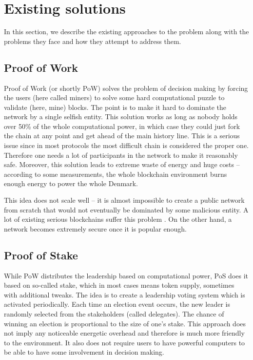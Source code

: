 \section{Existing solutions}

In this section, we describe the existing approaches to the problem along
with the problems they face and how they attempt to address them.

\subsection{Proof of Work}

Proof of Work (or shortly PoW) solves the problem of decision making by forcing the
users (here called miners) to solve some hard computational puzzle to validate
(here, mine) blocks\cite{bitcoin}.
The point is to make it hard to dominate the network by a
single selfish entity. This solution works as long as nobody holds over 50\% of the whole
computational power, in which case they could just fork the chain at any point
and get ahead of the main history line. This is a serious issue since in most
protocols the most difficult chain is considered the proper one. Therefore one needs a
lot of participants in the network to make it reasonably safe. Moreover, this
solution leads to extreme waste of energy and huge costs – according to some
measurements, the whole blockchain environment burns enough energy to power
the whole Denmark\cite{bitcoin_energy}.

This idea does not scale well – it is almost impossible to create a public
network from scratch that would not eventually be dominated by some malicious
entity. A lot of existing serious blockchains suffer this problem
\cite{51attack}. On the other hand, a network becomes extremely secure once
it is popular enough.

\subsection{Proof of Stake}

While PoW distributes the leadership based on computational power, PoS does it
based on so-called stake, which in most cases means token supply, sometimes
with additional tweaks\cite{peercoin}\cite{cryptocurr_without_pow}.
The idea is to create a leadership voting system
which is activated periodically. Each time an election event occurs,
the new leader is randomly selected from the stakeholders (called delegates).
The chance of winning an election is proportional to the size of one's stake.
This approach does
not imply any noticeable energetic overhead and therefore is much more friendly to the
environment. It also does not require users to have powerful computers to be able to
have some involvement in decision making.


